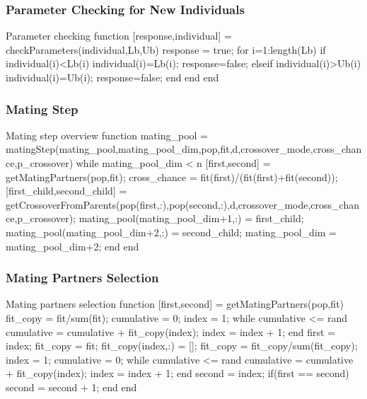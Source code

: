 \subsubsection{Parameter Checking for New Individuals}
\begin{mylisting}[enhanced,drop shadow,label={alg:param_check}]{Parameter checking}
function [response,individual] = checkParameters(individual,Lb,Ub)
  response = true;
  for i=1:length(Lb)
    if individual(i)<Lb(i)
      individual(i)=Lb(i);
      response=false;
    elseif individual(i)>Ub(i)
      individual(i)=Ub(i);
      response=false;
    end
  end
end
\end{mylisting}

\subsubsection{Mating Step}
\begin{mylisting}[enhanced,drop shadow,label={alg:mating}]{Mating step overview}
function mating_pool = matingStep(mating_pool,mating_pool_dim,pop,fit,d,crossover_mode,cross_chance,p_crossover)
  while mating_pool_dim < n
    [first,second] = getMatingPartners(pop,fit);
    cross_chance = fit(first)/(fit(first)+fit(second));
    [first_child,second_child] = getCrossoverFromParents(pop(first,:),pop(second,:),d,crossover_mode,cross_chance,p_crossover);
    mating_pool(mating_pool_dim+1,:) = first_child;
    mating_pool(mating_pool_dim+2,:) = second_child;
    mating_pool_dim = mating_pool_dim+2;
  end
end
\end{mylisting}

\subsubsection{Mating Partners Selection}
\begin{mylisting}[enhanced,drop shadow,label={alg:mating_selection}]{Mating partners selection}
function [first,second] = getMatingPartners(pop,fit)
  fit_copy = fit/sum(fit);
  cumulative = 0;
  index = 1;
  while cumulative <= rand
    cumulative = cumulative + fit_copy(index);
    index = index + 1;
  end
  first = index;
  fit_copy = fit;
  fit_copy(index,:) = [];
  fit_copy = fit_copy/sum(fit_copy);
  index = 1;
  cumulative = 0;
  while cumulative <= rand
    cumulative = cumulative + fit_copy(index);
    index = index + 1;
  end
  second = index;
  if(first == second)
    second = second + 1;
  end
end	
\end{mylisting}

